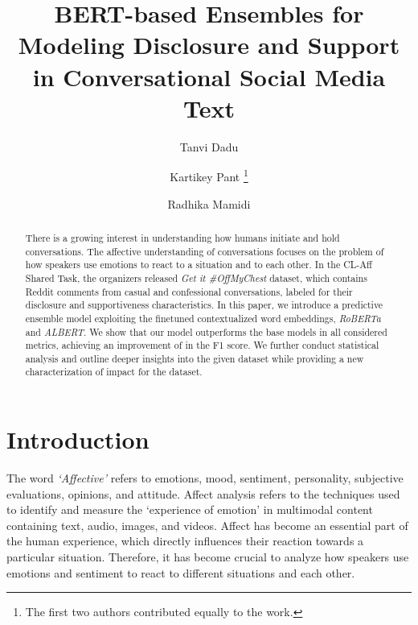 \documentclass[runningheads]{llncs}
\makeatletter
\newcommand{\printfnsymbol}[1]{\textsuperscript{\@fnsymbol{#1}}}
\makeatother
\begin{document}
\title{BERT-based Ensembles for Modeling Disclosure and Support in Conversational Social Media Text}
\author{Tanvi Dadu \printfnsymbol{1} \and 
Kartikey Pant \thanks{The first two authors contributed equally to the work.} \and 
Radhika Mamidi}
\maketitle              \begin{abstract}
There is a growing interest in understanding how humans initiate and hold conversations. The affective understanding of conversations focuses on the problem of how speakers use emotions to react to a situation and to each other. In the CL-Aff Shared Task, the organizers released \textit{Get it \#OffMyChest} dataset, which contains Reddit comments from casual and confessional conversations, labeled for their disclosure and supportiveness characteristics. In this paper, we introduce a predictive ensemble model exploiting the finetuned contextualized word embeddings, \textit{RoBERTa} and \textit{ALBERT}. We show that our model outperforms the base models in all considered metrics, achieving an improvement of  in the F1 score. We further conduct statistical analysis and outline deeper insights into the given dataset while providing a new characterization of impact for the dataset.

\end{abstract}
\section{Introduction}
The word \textit{‘Affective’} refers to emotions, mood, sentiment, personality, subjective evaluations, opinions, and attitude. Affect analysis refers to the techniques used to identify and measure the ‘experience of emotion’ in multimodal content containing text, audio, images, and videos.\cite{Rajendran2019HappyTL} Affect has become an essential part of the human experience, which directly influences their reaction towards a particular situation. Therefore, it has become crucial to analyze how speakers use emotions and sentiment to react to different situations and each other.
\end{document}
